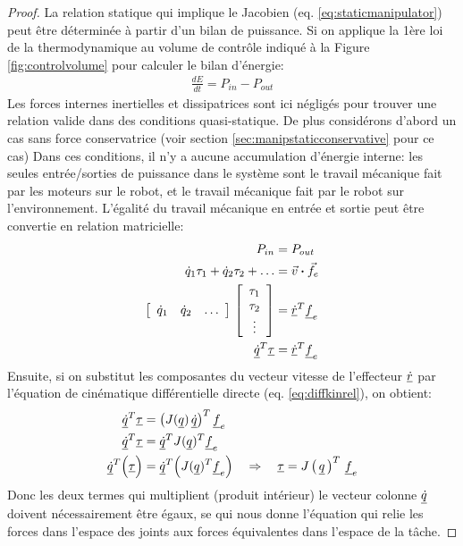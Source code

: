 \begin{proof}
La relation statique qui implique le Jacobien (eq. \eqref{eq:staticmanipulator}) peut être déterminée à partir d'un bilan de puissance. Si on applique la 1ère loi de la thermodynamique au volume de contrôle indiqué à la Figure \ref{fig:controlvolume} pour calculer le bilan d'énergie:
\begin{align}
\frac{dE}{dt} = P_{in} - P_{out}
\end{align}
Les forces internes inertielles et dissipatrices sont ici négligés pour trouver une relation valide dans des conditions quasi-statique. De plus considérons d'abord un cas sans force conservatrice (voir section \ref{sec:manipstaticconservative} pour ce cas) Dans ces conditions, il n'y a aucune accumulation d'énergie interne: les seules entrée/sorties de puissance dans le système sont le travail mécanique fait par les moteurs sur le robot, et le travail mécanique fait par le robot sur l'environnement. L'égalité du travail mécanique en entrée et sortie peut être convertie en relation matricielle:
\begin{align}
P_{in} &= P_{out} \\
\dot{q}_1 \tau_1  + \dot{q}_2 \tau_2 + \hdots  &= \Vec{v} \boldsymbol{\cdot} \Vec{f}_e \\
\left[ \begin{array}{c c c} 
\dot{q}_1 & \dot{q}_2 & \hdots 
\end{array} \right] \,
\left[ \begin{array}{c} 
\tau_1 \\ \tau_2 \\ \vdots 
\end{array} \right] &= \underline{\dot{r}}^T \underline{f}_e \\
\underline{\dot{q}}^T \underline{\tau} &= \underline{\dot{r}}^T \underline{f}_e \\
\end{align}
Ensuite, si on substitut les composantes du vecteur vitesse de l'effecteur $\underline{\dot{r}}$ par l'équation de cinématique différentielle directe (eq. \eqref{eq:diffkinrel}), on obtient:
\begin{align}
\underline{\dot{q}}^T \underline{\tau} &= \left( J( \underline{q}) \,  \underline{\dot{q}}  \right)^T \underline{f}_e \\
\underline{\dot{q}}^T \underline{\tau} &= \underline{\dot{q}}^T  J( \underline{q})^T \underline{f}_e    \\
\underline{\dot{q}}^T \Big( \underline{\tau} \Big) &= \underline{\dot{q}}^T  \Big( J( \underline{q})^T \underline{f}_e \Big)   
\quad \Rightarrow \quad \underline{\tau} = J\left( \, \underline{q} \, \right)^T \, \underline{f}_e 
\end{align}
Donc les deux termes qui multiplient (produit intérieur) le vecteur colonne $\underline{\dot{q}}$ doivent nécessairement être égaux, se qui nous donne l'équation qui relie les forces dans l'espace des joints aux forces équivalentes dans l'espace de la tâche. 
\end{proof}


